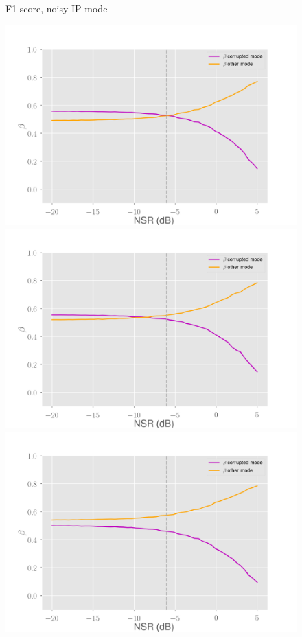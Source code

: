\documentclass[10pt]{beamer}
\begin{document}
\begin{frame}
\begin{multicols}{2}
\begin{figure}
\begin{overprint}
\end{overprint}
\caption{F1-score, noisy IP-mode}
\end{figure}
\columnbreak
\begin{figure}
\centering
\begin{overprint}
    \includegraphics[scale=0.2]{figs/no-energy-ip-noisy-beta}
    \includegraphics[scale=0.2]{figs/normal-ip-noisy-beta}
    \includegraphics[scale=0.2]{figs/high-energy-ip-noisy-beta}

\end{overprint}
\end{figure}
\end{multicols}
\end{frame}
\end{document}
